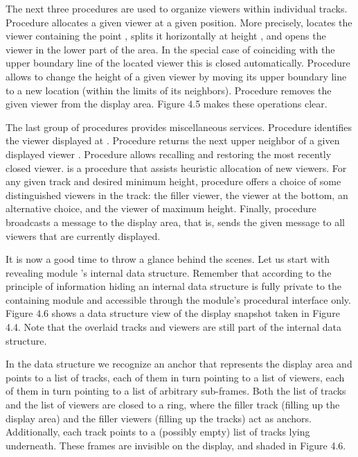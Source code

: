 The next three procedures are used to organize viewers within
individual tracks. Procedure  allocates a given viewer at a given
position. More precisely,  locates the viewer containing the point
, splits it horizontally at height , and opens the viewer  in
the lower part of the area. In the special case of  coinciding with
the upper boundary line of the located viewer this is closed
automatically. Procedure  allows to change the height of a given
viewer  by moving its upper boundary line to a new location  (within
the limits of its neighbors). Procedure  removes the given viewer
 from the display area. Figure 4.5 makes these operations clear.


The last group of procedures provides miscellaneous
services. Procedure  identifies the viewer displayed at .
Procedure  returns the next upper neighbor of a given
displayed viewer . Procedure  allows recalling and restoring
the most recently closed viewer.  is a procedure that assists
heuristic allocation of new viewers. For any given track and desired
minimum height, procedure  offers a choice of some distinguished
viewers in the track: the filler viewer, the viewer at the bottom, an
alternative choice, and the viewer of maximum height. Finally,
procedure  broadcasts a message to the display area, that is,
sends the given message to all viewers that are currently displayed.

It is now a good time to throw a glance behind the scenes. Let us
start with revealing module 's internal data structure. Remember
that according to the principle of information hiding an internal data
structure is fully private to the containing module and accessible
through the module’s procedural interface only. Figure 4.6 shows a
data structure view of the display snapshot taken in Figure 4.4. Note
that the overlaid tracks and viewers are still part of the internal
data structure.

In the data structure we recognize an anchor that represents the
display area and points to a list of tracks, each of them in turn
pointing to a list of viewers, each of them in turn pointing to a list
of arbitrary sub-frames. Both the list of tracks and the list of
viewers are closed to a ring, where the filler track (filling up the
display area) and the filler viewers (filling up the tracks) act as
anchors. Additionally, each track points to a (possibly empty) list of
tracks lying underneath. These frames are invisible on the display,
and shaded in Figure 4.6.


